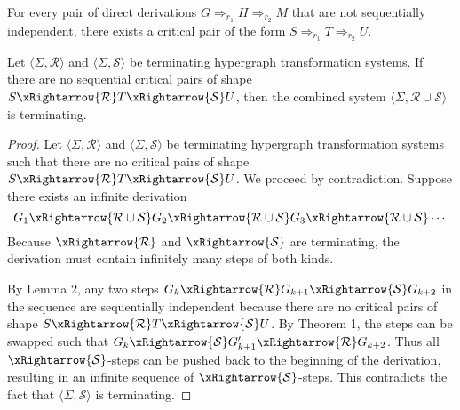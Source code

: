 \begin{lemma}
    For every pair of direct derivations $G \Rightarrow_{r_1} H \Rightarrow_{r_2} M$ that are not sequentially independent, there exists a critical pair of the form $S \Rightarrow_{r_1} T \Rightarrow_{r_2} U$.
\end{lemma}

\begin{theorem}
     Let $\langle \Sigma, \mathcal{R} \rangle$ and $\langle \Sigma, \mathcal{S} \rangle$ be terminating hypergraph transformation systems. If there are no sequential critical pairs of shape $S \xRightarrow{\mathcal{R}} T \xRightarrow{\mathcal{S}} U$, then the combined system $\langle \Sigma, \mathcal{R} \cup \mathcal{S} \rangle$ is terminating.
\end{theorem}
 \begin{proof}
    Let $\langle \Sigma, \mathcal{R} \rangle$ and $\langle \Sigma, \mathcal{S} \rangle$ be terminating hypergraph transformation systems such that there are no critical pairs of shape $S \xRightarrow{\mathcal{R}} T \xRightarrow{\mathcal{S}} U$. We proceed by contradiction. Suppose there exists an infinite derivation
    \[
    G_1 \xRightarrow{\mathcal{R} \cup \mathcal{S}} G_2 \xRightarrow{\mathcal{R} \cup \mathcal{S}} G_3 \xRightarrow{\mathcal{R} \cup \mathcal{S}} \cdots
    \]
    Because $\xRightarrow{\mathcal{R}}$ and $\xRightarrow{\mathcal{S}}$ are terminating, the derivation must contain infinitely many steps of both kinds. 
    
    By Lemma 2, any two steps $G_k \xRightarrow{\mathcal{R}} G_{k+1} \xRightarrow{\mathcal{S}} G_{k+2}$ in the sequence are sequentially independent because there are no critical pairs of shape $S \xRightarrow{\mathcal{R}} T \xRightarrow{\mathcal{S}} U$. By Theorem 1, the steps can be swapped such that $G_k \xRightarrow{\mathcal{S}} G'_{k+1} \xRightarrow{\mathcal{R}} G_{k+2}$. Thus all $\xRightarrow{\mathcal{S}}$-steps can be pushed back to the beginning of the derivation, resulting in an infinite sequence of $\xRightarrow{\mathcal{S}}$-steps. This contradicts the fact that $\langle \Sigma, \mathcal{S} \rangle$ is terminating.

 \end{proof}